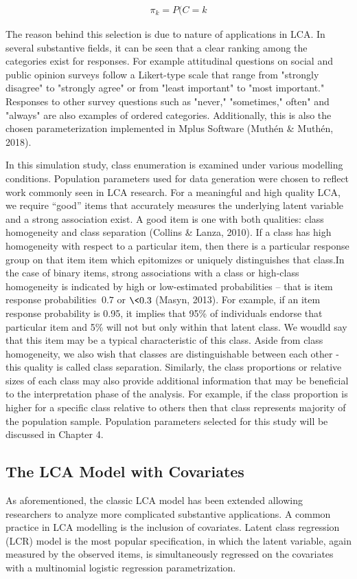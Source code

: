 \begin{align}
    \pi_{k} = P(C=k
\end{align}

The reason behind this selection is due to nature of applications in LCA. In several substantive fields, it can be seen that a clear ranking among the categories exist for responses. For example attitudinal questions on social and public opinion surveys follow a Likert-type scale that range from "strongly disagree" to "strongly agree" or from "least important" to "most important." Responses to other survey questions such as "never," "sometimes," often" and "always" are also examples of ordered categories. Additionally, this is also the chosen parameterization implemented in Mplus Software (Muth\'en \& Muth\'en, 2018). 



In this simulation study, class enumeration is examined under various modelling conditions. Population parameters used for data generation were chosen to reflect work commonly seen in LCA research. For a meaningful and high quality LCA, we require “good” items that accurately measures the underlying latent variable and a strong association exist. A good item is one with both qualities: class homogeneity and class separation (Collins \& Lanza, 2010). If a class has high homogeneity with respect to a particular item, then there is a particular response group on that item item which epitomizes or uniquely distinguishes that class.In the case of binary items, strong associations with a class or high-class homogeneity is indicated by high or low-estimated probabilities – that is item response probabilities $\> 0.7$ or $\< 0.3$ (Masyn, 2013). For example, if an item response probability is 0.95, it implies that 95\% of individuals endorse that particular item and 5\% will not but only within that latent class. We woudld say that this item may be a typical characteristic of this class. Aside from class homogeneity, we also wish that classes are distinguishable between each other - this quality is called class separation. Similarly, the class proportions or relative sizes of each class may also provide additional information that may be beneficial to the interpretation phase of the analysis. For example, if the class proportion is higher for a specific class relative to others then that class represents majority of the population sample. Population parameters selected for this study will be discussed in Chapter 4.

\subsection{The LCA Model with Covariates}

As aforementioned, the classic LCA model has been extended allowing researchers to analyze more complicated substantive applications. A common practice in LCA modelling is the inclusion of covariates. Latent class regression (LCR) model is the most popular specification, in which the latent variable, again measured by the observed items, is simultaneously regressed on the covariates with a multinomial logistic regression parametrization.  

